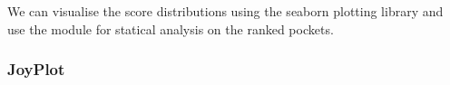 \documentclass[letterpaper,10pt,english]{sphinxmanual}
\begin{document}
\begin{sphinxVerbatim}[commandchars=\\\{\}]

   
\end{sphinxVerbatim}

We can visualise the score distributions using the seaborn plotting library and use the  module for
statical analysis on the ranked pockets.


\subsubsection{JoyPlot}
\label{\detokenize{tutorial:joyplot}}
\end{document}
